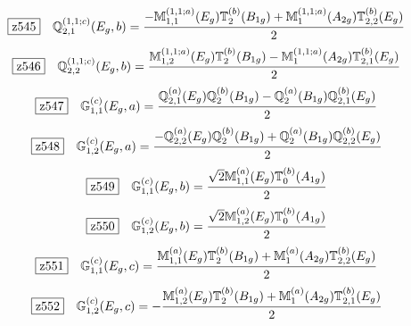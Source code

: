 \documentclass[fleqn,10pt,landscape]{jsarticle}
\begin{document}
\begin{dmath*}
\hspace*{3mm}\fbox{z545}\quad \mathbb{Q}_{2,1}^{(1,1;c)}(E_{g},b)=\frac{- \mathbb{M}_{1,1}^{(1,1;a)}(E_{g}) \mathbb{T}_{2}^{(b)}(B_{1g}) + \mathbb{M}_{1}^{(1,1;a)}(A_{2g}) \mathbb{T}_{2,2}^{(b)}(E_{g})}{2}
\end{dmath*}
\begin{dmath*}
\hspace*{3mm}\fbox{z546}\quad \mathbb{Q}_{2,2}^{(1,1;c)}(E_{g},b)=\frac{\mathbb{M}_{1,2}^{(1,1;a)}(E_{g}) \mathbb{T}_{2}^{(b)}(B_{1g}) - \mathbb{M}_{1}^{(1,1;a)}(A_{2g}) \mathbb{T}_{2,1}^{(b)}(E_{g})}{2}
\end{dmath*}
\begin{dmath*}
\hspace*{3mm}\fbox{z547}\quad \mathbb{G}_{1,1}^{(c)}(E_{g},a)=\frac{\mathbb{Q}_{2,1}^{(a)}(E_{g}) \mathbb{Q}_{2}^{(b)}(B_{1g}) - \mathbb{Q}_{2}^{(a)}(B_{1g}) \mathbb{Q}_{2,1}^{(b)}(E_{g})}{2}
\end{dmath*}
\begin{dmath*}
\hspace*{3mm}\fbox{z548}\quad \mathbb{G}_{1,2}^{(c)}(E_{g},a)=\frac{- \mathbb{Q}_{2,2}^{(a)}(E_{g}) \mathbb{Q}_{2}^{(b)}(B_{1g}) + \mathbb{Q}_{2}^{(a)}(B_{1g}) \mathbb{Q}_{2,2}^{(b)}(E_{g})}{2}
\end{dmath*}
\begin{dmath*}
\hspace*{3mm}\fbox{z549}\quad \mathbb{G}_{1,1}^{(c)}(E_{g},b)=\frac{\sqrt{2} \mathbb{M}_{1,1}^{(a)}(E_{g}) \mathbb{T}_{0}^{(b)}(A_{1g})}{2}
\end{dmath*}
\begin{dmath*}
\hspace*{3mm}\fbox{z550}\quad \mathbb{G}_{1,2}^{(c)}(E_{g},b)=\frac{\sqrt{2} \mathbb{M}_{1,2}^{(a)}(E_{g}) \mathbb{T}_{0}^{(b)}(A_{1g})}{2}
\end{dmath*}
\begin{dmath*}
\hspace*{3mm}\fbox{z551}\quad \mathbb{G}_{1,1}^{(c)}(E_{g},c)=\frac{\mathbb{M}_{1,1}^{(a)}(E_{g}) \mathbb{T}_{2}^{(b)}(B_{1g}) + \mathbb{M}_{1}^{(a)}(A_{2g}) \mathbb{T}_{2,2}^{(b)}(E_{g})}{2}
\end{dmath*}
\begin{dmath*}
\hspace*{3mm}\fbox{z552}\quad \mathbb{G}_{1,2}^{(c)}(E_{g},c)=- \frac{\mathbb{M}_{1,2}^{(a)}(E_{g}) \mathbb{T}_{2}^{(b)}(B_{1g}) + \mathbb{M}_{1}^{(a)}(A_{2g}) \mathbb{T}_{2,1}^{(b)}(E_{g})}{2}
\end{dmath*}
\end{document}
